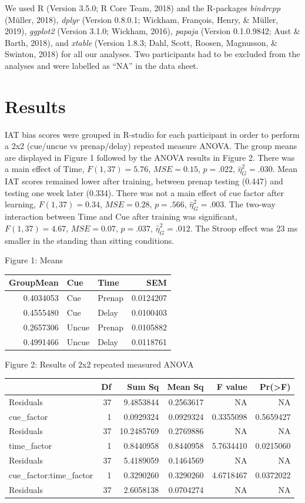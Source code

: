 \documentclass[man,floatsintext]{apa6}
\begin{document}
We used R (Version 3.5.0; R Core Team, 2018) and the R-packages
\emph{bindrcpp} (Müller, 2018), \emph{dplyr} (Version 0.8.0.1; Wickham,
François, Henry, \& Müller, 2019), \emph{ggplot2} (Version 3.1.0;
Wickham, 2016), \emph{papaja} (Version 0.1.0.9842; Aust \& Barth, 2018),
and \emph{xtable} (Version 1.8.3; Dahl, Scott, Roosen, Magnusson, \&
Swinton, 2018) for all our analyses. Two participants had to be excluded
from the analyses and were labelled as \enquote{NA} in the data sheet.

\section{Results}\label{results}

IAT bias scores were grouped in R-studio for each participant in order
to perform a 2x2 (cue/uncue vs prenap/delay) repeated measure ANOVA. The
group means are displayed in Figure 1 followed by the ANOVA results in
Figure 2. There was a main effect of Time, \(F(1, 37) = 5.76\),
\(\mathit{MSE} = 0.15\), \(p = .022\), \(\hat{\eta}^2_G = .030\). Mean
IAT scores remained lower after training, between prenap testing (0.447)
and testing one week later (0.334). There was not a main effect of cue
factor after learning, \(F(1, 37) = 0.34\), \(\mathit{MSE} = 0.28\),
\(p = .566\), \(\hat{\eta}^2_G = .003\). The two-way interaction between
Time and Cue after training was significant, \(F(1, 37) = 4.67\),
\(\mathit{MSE} = 0.07\), \(p = .037\), \(\hat{\eta}^2_G = .012\). The
Stroop effect was 23 ms smaller in the standing than sitting conditions.

Figure 1: Means

\begin{tabular}{r|l|l|r}
\hline
GroupMean & Cue & Time & SEM\\
\hline
0.4034053 & Cue & Prenap & 0.0124207\\
\hline
0.4555480 & Cue & Delay & 0.0100403\\
\hline
0.2657306 & Uncue & Prenap & 0.0105882\\
\hline
0.4991466 & Uncue & Delay & 0.0118761\\
\hline
\end{tabular}

Figure 2: Results of 2x2 repeated measured ANOVA

\begin{tabular}{l|r|r|r|r|r}
\hline
  & Df & Sum Sq & Mean Sq & F value & Pr(>F)\\
\hline
Residuals & 37 & 9.4853844 & 0.2563617 & NA & NA\\
\hline
cue\_factor & 1 & 0.0929324 & 0.0929324 & 0.3355098 & 0.5659427\\
\hline
Residuals & 37 & 10.2485769 & 0.2769886 & NA & NA\\
\hline
time\_factor & 1 & 0.8440958 & 0.8440958 & 5.7634410 & 0.0215060\\
\hline
Residuals & 37 & 5.4189059 & 0.1464569 & NA & NA\\
\hline
cue\_factor:time\_factor & 1 & 0.3290260 & 0.3290260 & 4.6718467 & 0.0372022\\
\hline
Residuals & 37 & 2.6058138 & 0.0704274 & NA & NA\\
\hline
\end{tabular}
\end{document}
